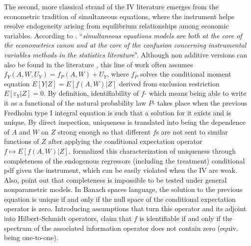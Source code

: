 \documentclass[12pt]{article}
\theoremstyle{thmstyleone}%
\theoremstyle{thmstyletwo}%
\theoremstyle{thmstylethree}%
\begin{document}
  The second, more classical strand of the IV literature emerges from the econometric tradition of simultaneous equations, where the instrument helps resolve endogeneity arising from equilibrium relationships among economic variables. According to \citep{imbens2014instrumental}. ``\textit{simultaneous equations models are both at the core of the econometrics canon and at the core of the confusion concerning instrumental variables methods in the statistics literature}''.
  Although non additive versions can also be found in the literature \citep{matzkin2003nonparametric, imbens2009identification}, this line of work often assumes $f_Y(A,W,U_Y) = f_P(A,W) + U_Y$, where $f_P$ solves the conditional moment equation $E [Y | Z]= E [f(A,W) | Z]$ derived from exclusion restriction $E [\varepsilon_Y | Z] = 0$. 
    By definition, identifiability of $f$- which means being able to write it as a functional of the natural probability law $P$- takes place when the previous Fredholm type I integral equation is such that a solution for it exists and is unique. By direct inspection, uniqueness is translated into being the dependence of $A$ and $W$ on $Z$ strong enough so that different $f$s are not sent to similar functions of $Z$ after applying the conditional expectation operator $ f \longmapsto E [f(A,W) | Z]$. \citep{newey03} formalized this characterization of uniqueness through  completeness \citep{lehmann1950} of the endogenous regressors (including the treatment) conditional pdf given the instrument, which can be easily violated when the IV are weak. Also, \citep{canay2013testability} point out that completeness is impossible to be tested under general nonparametric models. In Banach spaces language, the solution to the previous equation is unique if and only if the null space of the conditional expectation operator is zero. Introducing assumptions that turn this operator and its adjoint into Hilbert-Schmidt operators, \citep{darolles} claim that $f$ is identifiable if and only if the spectrum of the associated information operator does not contain zero (equiv. being one-to-one). 
    
\end{document}
